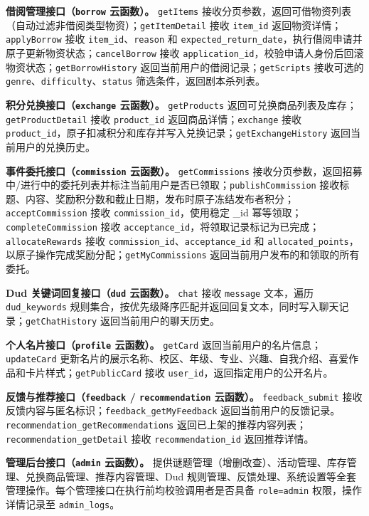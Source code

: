 \documentclass[a4paper,12pt]{article}
\begin{document}
\textbf{借阅管理接口（\texttt{borrow} 云函数）。} \texttt{getItems} 接收分页参数，返回可借物资列表（自动过滤非借阅类型物资）；\texttt{getItemDetail} 接收 \texttt{item\_id} 返回物资详情；\texttt{applyBorrow} 接收 \texttt{item\_id}、\texttt{reason} 和 \texttt{expected\_return\_date}，执行借阅申请并原子更新物资状态；\texttt{cancelBorrow} 接收 \texttt{application\_id}，校验申请人身份后回滚物资状态；\texttt{getBorrowHistory} 返回当前用户的借阅记录；\texttt{getScripts} 接收可选的 \texttt{genre}、\texttt{difficulty}、\texttt{status} 筛选条件，返回剧本杀列表。

\textbf{积分兑换接口（\texttt{exchange} 云函数）。} \texttt{getProducts} 返回可兑换商品列表及库存；\texttt{getProductDetail} 接收 \texttt{product\_id} 返回商品详情；\texttt{exchange} 接收 \texttt{product\_id}，原子扣减积分和库存并写入兑换记录；\texttt{getExchangeHistory} 返回当前用户的兑换历史。

\textbf{事件委托接口（\texttt{commission} 云函数）。} \texttt{getCommissions} 接收分页参数，返回招募中/进行中的委托列表并标注当前用户是否已领取；\texttt{publishCommission} 接收标题、内容、奖励积分数和截止日期，发布时原子冻结发布者积分；\texttt{acceptCommission} 接收 \texttt{commission\_id}，使用稳定 \_id 幂等领取；\texttt{completeCommission} 接收 \texttt{acceptance\_id}，将领取记录标记为已完成；\texttt{allocateRewards} 接收 \texttt{commission\_id}、\texttt{acceptance\_id} 和 \texttt{allocated\_points}，以原子操作完成奖励分配；\texttt{getMyCommissions} 返回当前用户发布的和领取的所有委托。

\textbf{Dud 关键词回复接口（\texttt{dud} 云函数）。} \texttt{chat} 接收 \texttt{message} 文本，遍历 \texttt{dud\_keywords} 规则集合，按优先级降序匹配并返回回复文本，同时写入聊天记录；\texttt{getChatHistory} 返回当前用户的聊天历史。

\textbf{个人名片接口（\texttt{profile} 云函数）。} \texttt{getCard} 返回当前用户的名片信息；\texttt{updateCard} 更新名片的展示名称、校区、年级、专业、兴趣、自我介绍、喜爱作品和卡片样式；\texttt{getPublicCard} 接收 \texttt{user\_id}，返回指定用户的公开名片。

\textbf{反馈与推荐接口（\texttt{feedback} / \texttt{recommendation} 云函数）。} \texttt{feedback\_submit} 接收反馈内容与匿名标识；\texttt{feedback\_getMyFeedback} 返回当前用户的反馈记录。\texttt{recommendation\_\allowbreak getRecommendations} 返回已上架的推荐内容列表；\texttt{recommendation\_\allowbreak getDetail} 接收 \texttt{recommendation\_id} 返回推荐详情。

\textbf{管理后台接口（\texttt{admin} 云函数）。} 提供谜题管理（增删改查）、活动管理、库存管理、兑换商品管理、推荐内容管理、Dud 规则管理、反馈处理、系统设置等全套管理操作。每个管理接口在执行前均校验调用者是否具备 \texttt{role=admin} 权限，操作详情记录至 \texttt{admin\_logs}。
\end{document}
